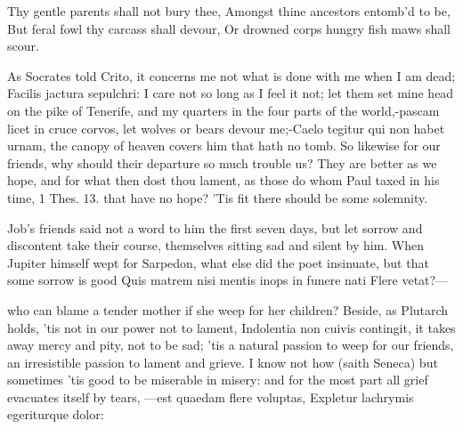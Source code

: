 {Thy gentle parents shall not bury thee,
Amongst thine ancestors entomb'd to be,
But feral fowl thy carcass shall devour,
Or drowned corps hungry fish maws shall scour.

As Socrates told Crito, it concerns me not what is done with me when I
am dead; Facilis jactura sepulchri: I care not so long as I feel it
not; let them set mine head on the pike of Tenerife, and my quarters in
the four parts of the world,-pascam licet in cruce corvos, let wolves
or bears devour me;-Caelo tegitur qui non habet urnam, the canopy
of heaven covers him that hath no tomb. So likewise for our friends,
why should their departure so much trouble us? They are better as we
hope, and for what then dost thou lament, as those do whom Paul taxed
in his time, 1 Thes.  13. that have no hope? 'Tis fit there should
be some solemnity.

Job's friends said not a word to him the first seven days, but let
sorrow and discontent take their course, themselves sitting sad and
silent by him. When Jupiter himself wept for Sarpedon, what else did
the poet insinuate, but that some sorrow is good
Quis matrem nisi mentis inops in funere nati
Flere vetat?---

who can blame a tender mother if she weep for her children? Beside, as
Plutarch holds, 'tis not in our power not to lament, Indolentia
non cuivis contingit, it takes away mercy and pity, not to be sad; 'tis
a natural passion to weep for our friends, an irresistible passion to
lament and grieve. I know not how (saith Seneca) but sometimes 'tis
good to be miserable in misery: and for the most part all grief
evacuates itself by tears,
---est quaedam flere voluptas,
Expletur lachrymis egeriturque dolor:

}
